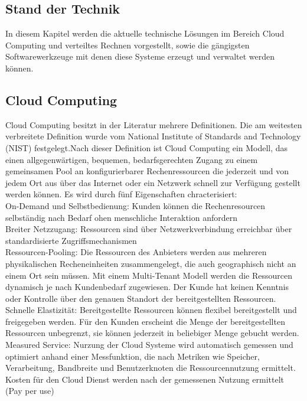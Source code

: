 \subsection*{Stand der Technik}

In diesem Kapitel werden die aktuelle technische Lösungen im Bereich Cloud Computing und verteiltes Rechnen
 vorgestellt, sowie die gängigsten Softwarewerkzeuge mit denen diese Systeme erzeugt und verwaltet werden können.

\subsection*{Cloud Computing}
Cloud Computing besitzt in der Literatur mehrere Definitionen.\cite{Marston2011} Die am weitesten verbreitete Definition wurde vom National Institute of Standards and Technology (NIST) festgelegt.Nach dieser Definition ist Cloud Computing ein Modell, das einen allgegenwärtigen, bequemen, bedarfsgerechten Zugang zu einem gemeinsamen Pool an konfigurierbarer Rechenressourcen die jederzeit und von jedem Ort aus über das Internet oder ein Netzwerk schnell zur Verfügung gestellt 
werden können. Es wird durch fünf Eigenschaften chracterisiert:   \\
On-Demand und Selbstbedienung: Kunden können die Rechenresourcen selbständig nach Bedarf ohen menschliche Interaktion anfordern \\
Breiter Netzzugang: Ressourcen sind über Netzwerkverbindung erreichbar über standardisierte Zugriffsmechanismen\\
Ressourcen-Pooling: Die Ressourcen des Anbieters werden aus mehreren physikalischen Recheneinheiten zusammengelegt, die auch geographisch nicht an einem Ort sein müssen. Mit einem Multi-Tenant Modell werden die Ressourcen dynamisch je nach Kundenbedarf zugewiesen. Der Kunde hat keinen Kenntnis oder Kontrolle über den genauen Standort der bereitgestellten Ressourcen. \\
Schnelle Elastizität: Bereitgestellte Ressourcen können flexibel bereitgestellt und freigegeben werden. Für den Kunden erscheint die Menge der bereitgestellten Ressourcen unbegrenzt, sie können jederzeit in beliebiger Menge gebucht werden.\\
Measured Service: Nurzung der Cloud Systeme wird automatisch gemessen und optimiert anhand einer Messfunktion, die nach Metriken wie Speicher, Verarbeitung, Bandbreite und Benutzerknoten die Ressourcennutzung ermittelt. Kosten für den Cloud Dienst werden nach der gemessenen Nutzung ermittelt (Pay per use) \cite{Mell2011} \\

